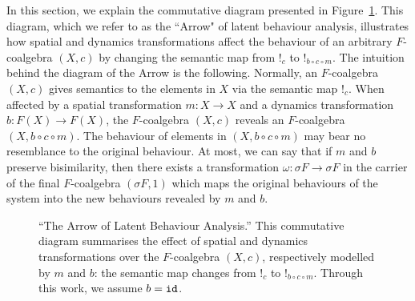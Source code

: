 In this section, we explain the commutative diagram presented in Figure~\ref{fig:TheArrow}. This diagram, which we refer to as the ``Arrow" of latent behaviour analysis, illustrates how spatial and dynamics transformations affect the behaviour of an arbitrary $F$-coalgebra $(X,c)$ by changing the semantic map from $!_c$ to $!_{b\circ c\circ m}$. The intuition behind the diagram of the Arrow is the following. Normally, an $F$-coalgebra $(X,c)$ gives semantics to the elements in $X$ via the semantic map $!_c$. When affected by a spatial transformation $m\colon X\rightarrow X$ and a dynamics transformation $b\colon F(X)\rightarrow F(X)$, the $F$-coalgebra $(X,c)$ reveals an $F$-coalgebra $(X,b\circ c\circ m)$. The behaviour of elements in $(X,b\circ c\circ m)$ may bear no resemblance to the original behaviour. At most, we can say that if $m$ and $b$ preserve bisimilarity, then there exists a transformation $\omega\colon \sigma F \rightarrow \sigma F$ in the carrier of the final $F$-coalgebra $(\sigma F, 1)$ which maps the original behaviours of the system into the new behaviours revealed by $m$ and $b$. 

\begin{figure}[h]
        \centering
        \caption{``The Arrow of Latent Behaviour Analysis.'' This commutative diagram summarises the effect of spatial and dynamics transformations over the $F$-coalgebra $(X,c)$, respectively modelled by $m$ and $b$: the semantic map changes from $!_c$ to $!_{b\circ c\circ m}$. Through this work, we assume $b={\texttt{id}}$.}
        \label{fig:TheArrow} 
    \end{figure}

